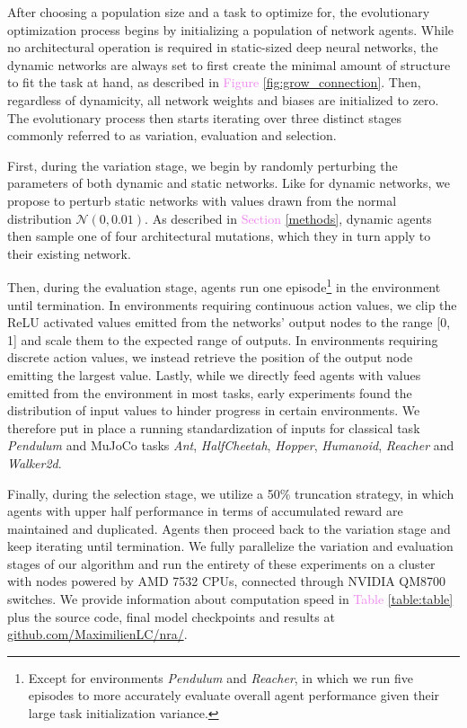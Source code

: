 \documentclass{article} %
\begin{document}
After choosing a population size and a task to optimize for, the evolutionary optimization process begins by initializing a population of network agents. While no architectural operation is required in static-sized deep neural networks, the dynamic networks are always set to first create the minimal amount of structure to fit the task at hand, as described in \textcolor{violet}{Figure \ref{fig:grow_connection}}. Then, regardless of dynamicity, all network weights and biases are initialized to zero. The evolutionary process then starts iterating over three distinct stages commonly referred to as variation, evaluation and selection.

First, during the variation stage, we begin by randomly perturbing the parameters of both dynamic and static networks. Like for dynamic networks, we propose to perturb static networks with values drawn from the normal distribution $\mathcal{N}(0, 0.01)$. As described in \textcolor{violet}{Section \ref{methods}}, dynamic agents then sample one of four architectural mutations, which they in turn apply to their existing network.

Then, during the evaluation stage, agents run one episode\footnote{Except for environments \textit{Pendulum} and \textit{Reacher}, in which we run five episodes to more accurately evaluate overall agent performance given their large task initialization variance.} in the environment until termination. In environments requiring continuous action values, we clip the ReLU activated values emitted from the networks' output nodes to the range [0, 1] and scale them to the expected range of outputs. In environments requiring discrete action values, we instead retrieve the position of the output node emitting the largest value. Lastly, while we directly feed agents with values emitted from the environment in most tasks, early experiments found the distribution of input values to hinder progress in certain environments. We therefore put in place a running standardization of inputs for classical task \textit{Pendulum} and MuJoCo tasks \textit{Ant}, \textit{HalfCheetah}, \textit{Hopper}, \textit{Humanoid}, \textit{Reacher} and \textit{Walker2d}.

Finally, during the selection stage, we utilize a 50\% truncation strategy, in which agents with upper half performance in terms of accumulated reward are maintained and duplicated. Agents then proceed back to the variation stage and keep iterating until termination. We fully parallelize the variation and evaluation stages of our algorithm and run the entirety of these experiments on a cluster with nodes powered by AMD 7532 CPUs, connected through NVIDIA QM8700 switches. We provide information about computation speed in \textcolor{violet}{Table \ref{table:table}} plus the source code, final model checkpoints and results at \textcolor{blue}{\href{http://www.github.com/MaximilienLC/nra/}{github.com/MaximilienLC/nra/}}.
\end{document}
